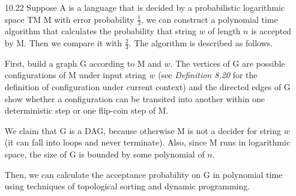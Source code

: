 \begin{itemize}
	\item[10.22]
	Suppose A is a language that is decided by a probabilistic logarithmic space
	TM M with error probability $ \frac{1}{3} $, we can construct a polynomial time algorithm that calculates the probability that string $ w $ of length $ n $ is accepted by M. Then we compare it with $ \frac{2}{3} $. The algorithm is described as follows.
	
	First, build a graph G according to M and $ w $. The vertices of G are possible configurations of M under input string $ w $ (see \textit{Definition 8.20} for the definition of configuration under current context) and the directed edges of G show whether a configuration can be transited into another within one deterministic step or one flip-coin step of M.
	
	We claim that G is a DAG, because otherwise M is not a decider for string $ w $ (it can fall into loops and never terminate). Also, since M runs in logarithmic space, the size of G is bounded by some polynomial of $ n $.
	
	Then, we can calculate the acceptance probability on G in polynomial time using techniques of topological sorting and dynamic programming.
	
\end{itemize}
